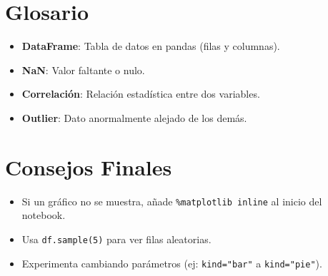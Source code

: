 \documentclass[12pt]{article}
\begin{document}
\section{Glosario}
\begin{itemize}
    \item \textbf{DataFrame}: Tabla de datos en pandas (filas y columnas).
    \item \textbf{NaN}: Valor faltante o nulo.
    \item \textbf{Correlación}: Relación estadística entre dos variables.
    \item \textbf{Outlier}: Dato anormalmente alejado de los demás.
\end{itemize}

\section{Consejos Finales}
\begin{itemize}
    \item Si un gráfico no se muestra, añade \texttt{\%matplotlib inline} al inicio del notebook.
    \item Usa \texttt{df.sample(5)} para ver filas aleatorias.
    \item Experimenta cambiando parámetros (ej: \texttt{kind="bar"} a \texttt{kind="pie"}).
\end{itemize}
\end{document}
